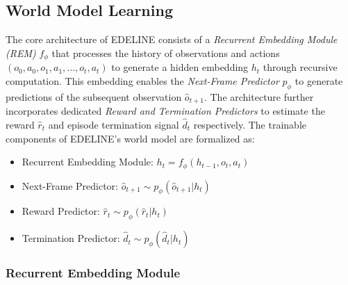 
\subsection{World Model Learning}

The core architecture of EDELINE consists of a \textit{Recurrent Embedding Module {(REM)}} $f_\phi$ that processes the history of observations and actions $(o_0, a_0, o_1, a_1, ..., o_t, a_t)$ to generate a hidden embedding $h_t$ through recursive computation. This embedding enables the \textit{Next-Frame Predictor} $p_\phi$ to generate predictions of the subsequent observation $\hat{o}_{t+1}$. The architecture further incorporates dedicated \textit{Reward and Termination Predictors} to estimate the reward $\hat{r}_t$ and episode termination signal $\hat{d}_t$ respectively. The trainable components of EDELINE's world model are formalized as: \vspace{-2em}
\begin{itemize} [itemsep=3pt, parsep=0pt]
    \item Recurrent Embedding Module: $h_t = f_\phi(h_{t-1}, o_t, a_t)$
    \item Next-Frame Predictor: $\hat{o}_{t+1} \sim p_\phi(\hat{o}_{t+1}|h_t)$
    \item Reward Predictor: $\hat{r}_t \sim p_\phi(\hat{r}_t|h_t)$
    \item Termination Predictor: $\hat{d}_t \sim p_\phi(\hat{d}_t|h_t)$
\end{itemize}

\subsubsection{Recurrent Embedding Module 
}

